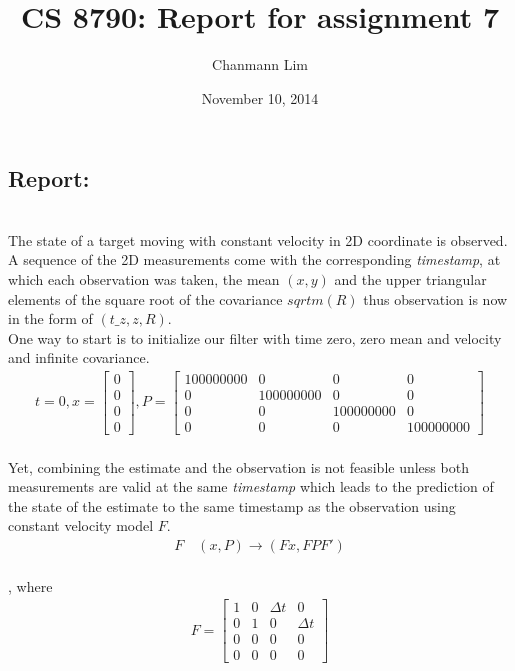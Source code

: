 \documentclass[a4paper]{article}
\begin{document}
\title{CS 8790: Report for assignment 7}
\author{Chanmann Lim}
\date{November 10, 2014}
\maketitle

\subsection*{Report:} ~\\
\indent The state of a target moving with constant velocity in 2D coordinate is observed. A sequence of the 2D measurements come with the corresponding \emph{timestamp}, at which each observation was taken, the mean $(x, y)$ and the upper triangular elements of the square root of the covariance $sqrtm(R)$ thus observation is now in the form of $(t\_z, z, R)$. \\

One way to start is to initialize our filter with time zero, zero mean and velocity and infinite covariance. \\
\begin{align*}
t = 0, 
x = \begin{bmatrix}
		0 \\ 0 \\ 0 \\ 0
	\end{bmatrix}, 
P = \begin{bmatrix}
		100000000 & 0 & 0 & 0 \\
		0 & 100000000 & 0 & 0 \\
		0 & 0 & 100000000 & 0 \\
		0 & 0 & 0 & 100000000
	\end{bmatrix}
\end{align*} \\
\noindent Yet, combining the estimate and the observation is not feasible unless both measurements are valid at the same \emph{timestamp} which leads to the prediction of the state of the estimate to the same timestamp as the observation using constant velocity model $F$. \\
\begin{align*}
F \quad (x, P) \to (Fx, FPF')
\end{align*} \\
, where
\begin{align*}
F = \begin{bmatrix}
		1 & 0 & \Delta{t} & 0 \\
		0 & 1 & 0 & \Delta{t} \\
		0 & 0 & 0 & 0 \\
		0 & 0 & 0 & 0
	\end{bmatrix}
\end{align*} \\
\end{document}
